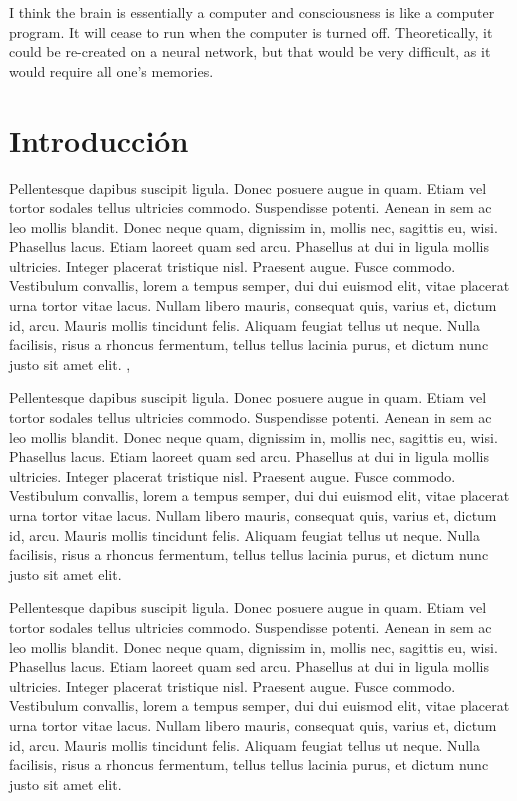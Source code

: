 \begin{savequote}[72mm]

I think the brain is essentially a computer and consciousness is like
a computer program. It will cease to run when the computer is turned
off. Theoretically, it could be re-created on a neural network, but
that would be very difficult, as it would require all one's memories.

\end{savequote}

\chapter{Introducción}
\label{cha:Introducción}

Pellentesque dapibus suscipit ligula.  Donec posuere augue in quam.
Etiam vel tortor sodales tellus ultricies commodo.  Suspendisse
potenti.  Aenean in sem ac leo mollis blandit.  Donec neque quam,
dignissim in, mollis nec, sagittis eu, wisi.  Phasellus lacus.  Etiam
laoreet quam sed arcu.  Phasellus at dui in ligula mollis ultricies.
Integer placerat tristique nisl.  Praesent augue.  Fusce commodo.
Vestibulum convallis, lorem a tempus semper, dui dui euismod elit,
vitae placerat urna tortor vitae lacus.  Nullam libero mauris,
consequat quis, varius et, dictum id, arcu.  Mauris mollis tincidunt
felis.  Aliquam feugiat tellus ut neque.  Nulla facilisis, risus a
rhoncus fermentum, tellus tellus lacinia purus, et dictum nunc justo
sit amet elit. \cite{Kohonen2001}, \cite{vanderSmagt1996}


Pellentesque dapibus suscipit ligula.  Donec posuere augue in quam.
Etiam vel tortor sodales tellus ultricies commodo.  Suspendisse
potenti.  Aenean in sem ac leo mollis blandit.  Donec neque quam,
dignissim in, mollis nec, sagittis eu, wisi.  Phasellus lacus.  Etiam
laoreet quam sed arcu.  Phasellus at dui in ligula mollis ultricies.
Integer placerat tristique nisl.  Praesent augue.  Fusce commodo.
Vestibulum convallis, lorem a tempus semper, dui dui euismod elit,
vitae placerat urna tortor vitae lacus.  Nullam libero mauris,
consequat quis, varius et, dictum id, arcu.  Mauris mollis tincidunt
felis.  Aliquam feugiat tellus ut neque.  Nulla facilisis, risus a
rhoncus fermentum, tellus tellus lacinia purus, et dictum nunc justo
sit amet elit.

Pellentesque dapibus suscipit ligula.  Donec posuere augue in quam.
Etiam vel tortor sodales tellus ultricies commodo.  Suspendisse
potenti.  Aenean in sem ac leo mollis blandit.  Donec neque quam,
dignissim in, mollis nec, sagittis eu, wisi.  Phasellus lacus.  Etiam
laoreet quam sed arcu.  Phasellus at dui in ligula mollis ultricies.
Integer placerat tristique nisl.  Praesent augue.  Fusce commodo.
Vestibulum convallis, lorem a tempus semper, dui dui euismod elit,
vitae placerat urna tortor vitae lacus.  Nullam libero mauris,
consequat quis, varius et, dictum id, arcu.  Mauris mollis tincidunt
felis.  Aliquam feugiat tellus ut neque.  Nulla facilisis, risus a
rhoncus fermentum, tellus tellus lacinia purus, et dictum nunc justo
sit amet elit.

